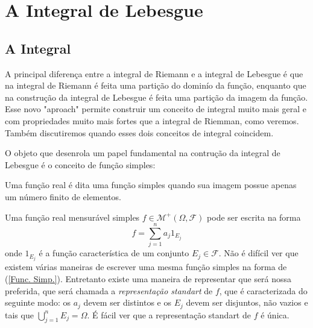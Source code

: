 \chapter[Aula 9]{A Integral de Lebesgue}
\chaptermark{}

\section{A Integral}

A principal diferença entre a integral de Riemann e a integral
de Lebesgue é que na integral de Riemann é feita uma 
partição do dominío da função, enquanto que na construção da
 integral de Lebesgue é feita uma partição da imagem da função.
Esse novo  "aproach" permite construir um conceito de integral muito
mais geral e com propriedades muito mais fortes  que a integral de Riemman, 
como veremos. Também discutiremos quando esses dois conceitos 
de integral coincidem.

O objeto que desenrola um papel fundamental na 
contrução da integral de Lebesgue é o conceito de função simples: 
\begin{definicao}
Uma função real é dita uma função simples
 quando sua imagem possue apenas um número
  finito de elementos.
\end{definicao}
Uma função real  mensurável simples $f\in \mathcal{M}^{+}(\Omega,\mathcal{F})$ pode ser escrita na forma 
\begin{equation}\label{Func. Simp.}
f=\sum_{j=1}^{n}a_j 1_{E_j}
\end{equation}
onde $1_{E_j}$ é a função característica de um conjunto $E_j\in \mathcal{F}$. 
 Não é difícil ver que existem várias maneiras de escrever uma mesma função
  simples na forma de (\ref{Func. Simp.}). Entretanto existe uma maneira de
  representar  que será nossa preferida, que será chamada a
   \emph{representação standart } de $f$, 
   que é caracterizada do seguinte modo: os $a_j$ 
   devem ser distintos e os $E_j$ devem ser disjuntos,  não vazios e tais que 
   $\bigcup_{j=1}^nE_j=\Omega$. É fácil ver que a representação standart de $f$ é única.
